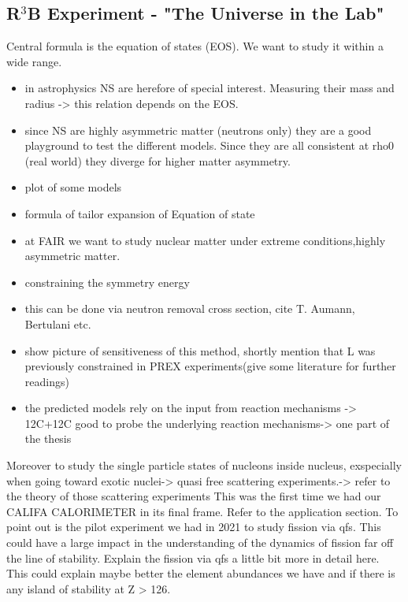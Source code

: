 \subsection{R$^3$B Experiment - "The Universe in the Lab"}
Central formula is the equation of states (EOS). We want to study it within a wide range. 
\begin{itemize}
\item in astrophysics NS are herefore of special interest. Measuring their mass and radius -> this relation depends on the EOS. 
\item since NS are highly asymmetric matter (neutrons only) they are a good playground to test the different models. Since they are all consistent at rho0 (real world) they diverge for higher matter asymmetry. 
\item plot of some models
\item formula of tailor expansion of Equation of state
\item at FAIR we want to study  nuclear matter under extreme conditions,highly asymmetric matter. 
\item constraining the symmetry energy
\item this can be done via neutron removal cross section, cite T. Aumann, Bertulani etc.
\item show picture of sensitiveness of this method, shortly mention that L was previously constrained in PREX experiments(give some literature for further readings)
\item the predicted models rely on the input from reaction mechanisms -> 12C+12C good to probe the underlying reaction mechanisms-> one part of the thesis
\end{itemize}
Moreover to study the single particle states of nucleons inside nucleus, exspecially when going toward exotic nuclei-> quasi free scattering experiments.-> refer to the theory of those scattering experiments
This was the first time we had our CALIFA CALORIMETER in its final frame. 
Refer to the application section. \newline
To point out is the pilot experiment we had in 2021 to study fission via qfs. This could have a large impact in the understanding of the dynamics of fission far off the line of stability. \newline
Explain the fission via qfs a little bit more in detail here.\newline
This could explain maybe better the element abundances we have and if there is any island of stability at Z > 126.


